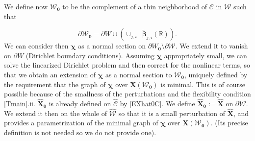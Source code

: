 \documentclass[12pt,namelimits,sumlimits]{amsart}
\theoremstyle{remark}
\numberwithin{equation}{section}
\begin{document}
We define now ${{\mathcal{W}}}_{{\boldsymbol{0}}}$ to be the complement of a thin neighborhood of ${{\mathcal{C}}}$ in ${{\mathcal{W}}}$
such that
\addtocounter{theorem}{1}
\begin{equation}
\label{EW0}
\partial {{\mathcal{W}}}_{{\boldsymbol{0}}}=\partial W\cup
\left(\cup_{j,i} \,\,\,{\check{\boldsymbol{\beta}}}_{j,i}({\mathbb{R}})\right).
\end{equation}
We can consider then ${\boldsymbol{\chi}}$ as a normal section on $\partial W_{{\boldsymbol{0}}}\setminus\partial{{\mathcal{W}}}$.
We extend it to vanish on $\partial W$ (Dirichlet boundary conditions).
Assuming ${\boldsymbol{\chi}}$ appropriately small,
we can solve the linearized Dirichlet problem and then correct for the nonlinear terms,
so that we obtain an extension of ${\boldsymbol{\chi}}$ as a normal section to ${{\mathcal{W}}}_{{\boldsymbol{0}}}$,
uniquely defined by the requirement that the graph of ${\boldsymbol{\chi}}$ over ${\boldsymbol{X}}({{\mathcal{W}}}_{{\boldsymbol{0}}})$ is minimal.
This is of course possible because of the smallness of the perturbations and the flexibility condition
\ref{Tmain}.ii.
${\widehat{\boldsymbol{X}}}_{{\boldsymbol{0}}}$ is already defined on ${{\widehat{{\mathcal{C}}}}}$ by \ref{EXhat0C}.
We define ${\widehat{\boldsymbol{X}}}_{{\boldsymbol{0}}}:={\widehat{\boldsymbol{X}}}$ on $\partial{{\mathcal{W}}}$.
We extend it then on the whole of ${{\widehat{{\mathcal{W}}}}}$ so that it is a small perturbation of ${\widehat{\boldsymbol{X}}}$,
and provides a parametrization of the minimal graph of ${\boldsymbol{\chi}}$ over ${\boldsymbol{X}}({{\mathcal{W}}}_{{\boldsymbol{0}}})$.
(Its precise definition is not needed so we do not provide one).
\end{document}

